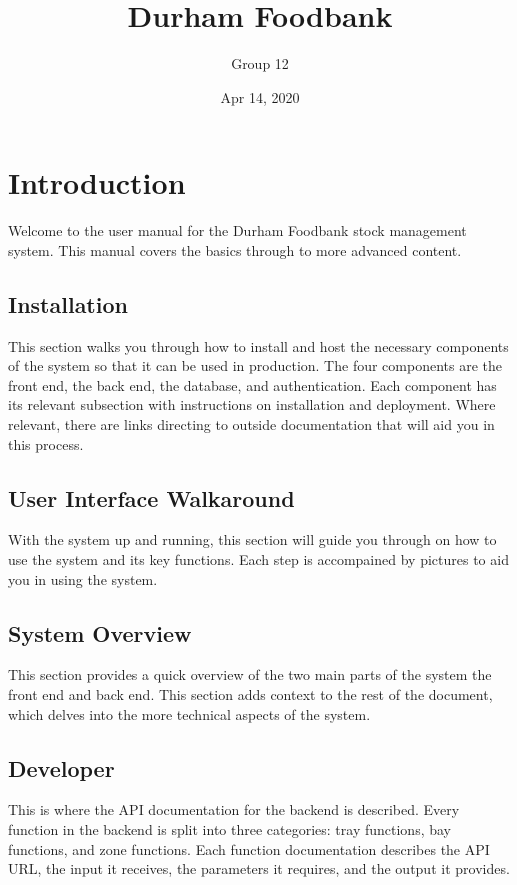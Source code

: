 \documentclass[letterpaper,10pt,english]{sphinxmanual}
\title{Durham Foodbank}
\date{Apr 14, 2020}
\author{Group 12}
\begin{document}
\pagestyle{empty}
\sphinxmaketitle
\pagestyle{plain}
\sphinxtableofcontents
\pagestyle{normal}
\label{\detokenize{index::doc}}



\chapter{Introduction}
\label{\detokenize{index:introduction}}
Welcome to the user manual for the Durham Foodbank stock management
system. This manual covers the basics through to more advanced content.


\section{Installation}
\label{\detokenize{Introduction:installation}}\label{\detokenize{Introduction::doc}}
This section walks you through how to install and host the necessary
components of the system so that it can be used in production. The four
components are the front end, the back end, the database, and
authentication. Each component has its relevant subsection with
instructions on installation and deployment. Where relevant, there are
links directing to outside documentation that will aid you in this
process.


\section{User Interface Walkaround}
\label{\detokenize{Introduction:user-interface-walkaround}}
With the system up and running, this section will guide you through on
how to use the system and its key functions. Each step is accompained by
pictures to aid you in using the system.


\section{System Overview}
\label{\detokenize{Introduction:system-overview}}
This section provides a quick overview of the two main parts of the
system \sphinxhyphen{} the front end and back end. This section adds context to the
rest of the document, which delves into the more technical aspects of
the system.


\section{Developer}
\label{\detokenize{Introduction:developer}}
This is where the API documentation for the backend is described. Every
function in the backend is split into three categories: tray functions,
bay functions, and zone functions. Each function documentation describes
the API URL, the input it receives, the parameters it requires, and the
output it provides.
\end{document}
